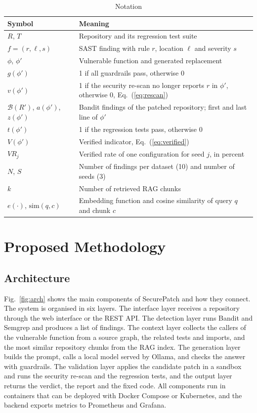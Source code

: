 \documentclass[12pt,onecolumn,draftclsnofoot]{IEEEtran}
\begin{document}
\begin{table}[!tb]
\centering
\caption{Notation}
\label{tab:notation}
\small
\renewcommand{\arraystretch}{1.15}
\begin{tabular}{L{3.2cm} L{10.0cm}}
\toprule
\textbf{Symbol} & \textbf{Meaning} \\
\midrule
$R$, $T$ & Repository and its regression test suite \\
$f=(r,\ell,s)$ & SAST finding with rule $r$, location $\ell$ and severity $s$ \\
$\phi$, $\phi'$ & Vulnerable function and generated replacement \\
$g(\phi')$ & 1 if all guardrails pass, otherwise 0 \\
$v(\phi')$ & 1 if the security re-scan no longer reports $r$ in $\phi'$, otherwise 0, Eq.~(\ref{eq:rescan}) \\
$\mathcal{B}(R')$, $a(\phi')$, $z(\phi')$ & Bandit findings of the patched repository; first and last line of $\phi'$ \\
$t(\phi')$ & 1 if the regression tests pass, otherwise 0 \\
$V(\phi')$ & Verified indicator, Eq.~(\ref{eq:verified}) \\
$VR_j$ & Verified rate of one configuration for seed $j$, in percent \\
$N$, $S$ & Number of findings per dataset (10) and number of seeds (3) \\
$k$ & Number of retrieved RAG chunks \\
$e(\cdot)$, $\mathrm{sim}(q,c)$ & Embedding function and cosine similarity of query $q$ and chunk $c$ \\
\bottomrule
\end{tabular}
\end{table}

\section{Proposed Methodology}

\subsection{Architecture}
Fig.~\ref{fig:arch} shows the main components of SecurePatch and how they connect. The system is organised in six layers. The interface layer receives a repository through the web interface or the REST API. The detection layer runs Bandit and Semgrep and produces a list of findings. The context layer collects the callers of the vulnerable function from a source graph, the related tests and imports, and the most similar repository chunks from the RAG index. The generation layer builds the prompt, calls a local model served by Ollama, and checks the answer with guardrails. The validation layer applies the candidate patch in a sandbox and runs the security re-scan and the regression tests, and the output layer returns the verdict, the report and the fixed code. All components run in containers that can be deployed with Docker Compose or Kubernetes, and the backend exports metrics to Prometheus and Grafana.
\end{document}
